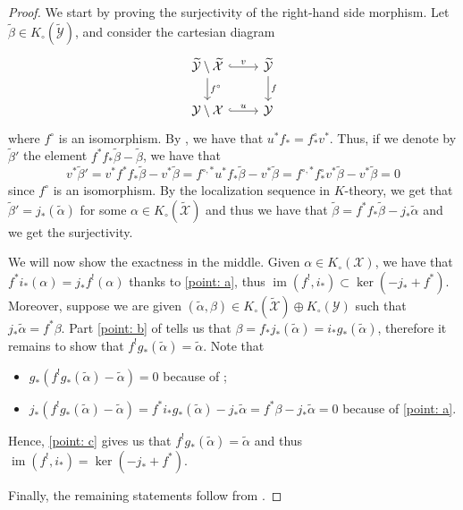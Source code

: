 \documentclass[12pt]{amsart}
\newcommand{\cX}{\mathcal{X}}
\newcommand{\cY}{\mathcal{Y}}
\newcommand{\im}{\operatorname{im}}
\newcommand{\Kgroup}{K_{\circ}}
\theoremstyle{definition}
\begin{document}
\begin{proof}
    We start by proving the surjectivity of the right-hand side morphism. Let $\widetilde{\beta} \in \Kgroup(\widetilde{\cY})$, and consider the cartesian diagram
    $$
    \begin{tikzcd}
    \widetilde{\cY}\setminus \widetilde{\cX} \arrow[r, "v", hook] \arrow[d, "f^{\circ}"] & \widetilde{\cY} \arrow[d, "f"] \\
    \cY \setminus \cX \arrow[r, "u", hook]                                       & \cY                       
    \end{tikzcd}
    $$
    where $f^{\circ}$ is an isomorphism. By , we have that $u^{*}f_*=f^{\circ}_*v^*$. Thus, if we denote by $\widetilde{\beta}'$ the element $f^*f_*\widetilde{\beta}-\widetilde{\beta}$, we have that 
    $$ v^*\widetilde{\beta}'= v^*f^*f_*\widetilde{\beta}-v^*\widetilde{\beta}= f^{\circ,*}u^*f_*\widetilde{\beta}-v^*\widetilde{\beta}=f^{\circ,*}f^{\circ}_*v^*\widetilde{\beta}-v^*\widetilde{\beta}=0$$
    since $f^{\circ}$ is an isomorphism. By the localization sequence in $K$-theory, we get that $\widetilde{\beta}'=j_*(\widetilde{\alpha})$ for some $\alpha \in \Kgroup(\widetilde{\cX})$ and thus we have that $\widetilde{\beta}=f^{*}f_*\widetilde{\beta}-j_*{\widetilde{\alpha}}$ and we get the surjectivity.

    We will now show the exactness in the middle. Given $\alpha\in \Kgroup(\cX)$, we have that $f^*i_*(\alpha)=j_*f^!(\alpha)$ thanks to \ref{point: a}, thus $\im(f^!,i_*)\subset \ker(-j_*+f^*)$. Moreover, suppose we are given $(\widetilde{\alpha},\beta) \in \Kgroup(\widetilde{\cX})\oplus \Kgroup(\cY)$ such that $j_*\widetilde{\alpha}=f^*\beta$. Part \ref{point: b} of  tells us that $\beta=f_*j_*(\widetilde{\alpha})=i_*g_*(\widetilde\alpha)$, therefore it remains to show that $f^!g_*(\widetilde\alpha)=\widetilde\alpha$. Note that
    \begin{itemize}
        \item $g_*\left(f^!g_*(\widetilde\alpha)-\widetilde\alpha\right)=0$ because of ;
        \item $j_*\left(f^!g_*(\widetilde\alpha)-\widetilde\alpha\right)=f^*i_*g_*(\widetilde\alpha)-j_*\widetilde\alpha=f^*\beta-j_*\widetilde\alpha=0$ because of \ref{point: a}.
    \end{itemize}
    Hence, \ref{point: c} gives us that $f^!g_*(\widetilde\alpha)=\widetilde\alpha$ and thus $\im(f^!,i_*)= \ker(-j_*+f^*)$.

    Finally, the remaining statements follow from .
\end{proof}
\end{document}
